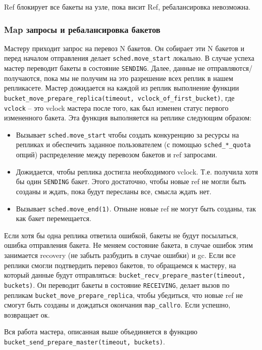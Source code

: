 Ref блокирует все бакеты на узле, пока висит Ref, ребалансировка невозможна.

\subsubsection{Map запросы и ребалансировка бакетов}

Мастеру приходит запрос на перевоз N бакетов. Он собирает эти N бакетов и перед
началом отправления делает \texttt{sched.move\_start} локально. В случае успеха
мастер переводит бакеты в состояние \texttt{SENDING}. Далее, данные не
отправляются/получаются, пока мы не получим на это разрешение всех реплик в
нашем репликасете. Мастер дожидается на каждой из реплик выполнение функции
\texttt{bucket\_move\_prepare\_replica(timeout, vclock\_of\_first\_bucket)}, где
\texttt{vclock} -- это vclock мастера после того, как был изменен статус
первого измененного бакета. Эта функция выполняется на реплике следующим
образом:

\begin{itemize}
\item Вызывает \texttt{sched.move\_start} чтобы создать конкуренцию за ресурсы
    на репликах и обеспечить заданное пользователем (с помощью
        \texttt{sched\_*\_quota} опций) распределение между перевозом бакетов и
        ref запросами.
\item Дожидается, чтобы реплика достигла необходимого vclock. Т.е. получила
    хотя бы один \texttt{SENDING} бакет. Этого достаточно, чтобы новые ref не
        могли быть созданы и ждать, пока будут пересланы все, смысла ждать нет.
\item Вызывает \texttt{sched.move\_end(1)}. Отныне новые ref не могут быть
    созданы, так как бакет перемещается.
\end{itemize}

Если хотя бы одна реплика ответила ошибкой, бакеты не будут посылаться, ошибка
отправления бакета. Не меняем состояние бакета, в случае ошибок этим занимается
recovery (не забыть разбудить в случае ошибки) и gc. Если все реплики смогли
подтвердить перевоз бакетов, то обращаемся к мастеру, на который данные будут
отправляться: \texttt{bucket\_recv\_prepare\_master(timeout, buckets)}. Он
переводит бакеты в состояние \texttt{RECEIVING}, делает вызов по репликам
\texttt{bucket\_move\_prepare\_replica}, чтобы убедиться, что новые ref не смогут
быть созданы и дождаться окончания \texttt{map\_callro}. Если успешно,
возвращает ок.

Вся работа мастера, описанная выше объединяется в функцию
\texttt{bucket\_send\_prepare\_master(timeout, buckets)}.

